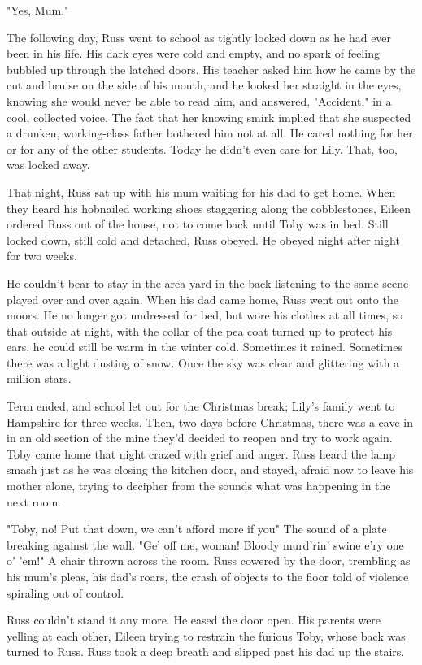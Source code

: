 "Yes, Mum."

The following day, Russ went to school as tightly locked down as he had ever been in his life. His dark eyes were cold and empty, and no spark of feeling bubbled up through the latched doors. His teacher asked him how he came by the cut and bruise on the side of his mouth, and he looked her straight in the eyes, knowing she would never be able to read him, and answered, "Accident," in a cool, collected voice. The fact that her knowing smirk implied that she suspected a drunken, working-class father bothered him not at all. He cared nothing for her or for any of the other students. Today he didn't even care for Lily. That, too, was locked away.

That night, Russ sat up with his mum waiting for his dad to get home. When they heard his hobnailed working shoes staggering along the cobblestones, Eileen ordered Russ out of the house, not to come back until Toby was in bed. Still locked down, still cold and detached, Russ obeyed. He obeyed night after night for two weeks.

He couldn't bear to stay in the area yard in the back listening to the same scene played over and over again. When his dad came home, Russ went out onto the moors. He no longer got undressed for bed, but wore his clothes at all times, so that outside at night, with the collar of the pea coat turned up to protect his ears, he could still be warm in the winter cold. Sometimes it rained. Sometimes there was a light dusting of snow. Once the sky was clear and glittering with a million stars.

Term ended, and school let out for the Christmas break; Lily's family went to Hampshire for three weeks. Then, two days before Christmas, there was a cave-in in an old section of the mine they'd decided to reopen and try to work again. Toby came home that night crazed with grief and anger. Russ heard the lamp smash just as he was closing the kitchen door, and stayed, afraid now to leave his mother alone, trying to decipher from the sounds what was happening in the next room.

"Toby, no! Put that down, we can't afford more if you{\el}" The sound of a plate breaking against the wall. "Ge' off me, woman! Bloody murd'rin' swine e'ry one o' 'em!" A chair thrown across the room. Russ cowered by the door, trembling as his mum's pleas, his dad's roars, the crash of objects to the floor told of violence spiraling out of control.

Russ couldn't stand it any more. He eased the door open. His parents were yelling at each other, Eileen trying to restrain the furious Toby, whose back was turned to Russ. Russ took a deep breath and slipped past his dad up the stairs.

